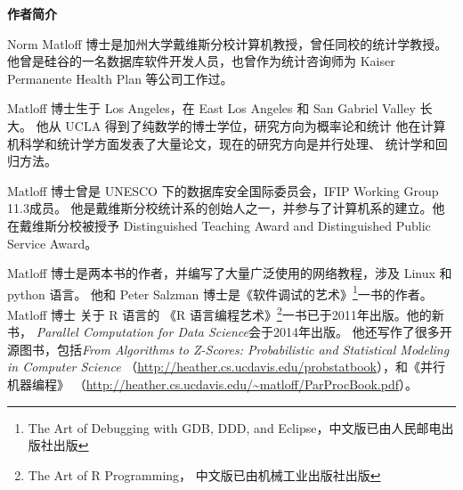 \begin{center}
{\bf 作者简介}
\end{center}

Norm Matloff 博士是加州大学戴维斯分校计算机教授，曾任同校的统计学教授。
他曾是硅谷的一名数据库软件开发人员，也曾作为统计咨询师为 Kaiser Permanente Health Plan 等公司工作过。

Matloff 博士生于 Los Angeles，在 East Los Angeles 和 San Gabriel Valley 长大。
他从 UCLA 得到了纯数学的博士学位，研究方向为概率论和统计
他在计算机科学和统计学方面发表了大量论文，现在的研究方向是并行处理、
统计学和回归方法。


Matloff 博士曾是 UNESCO 下的数据库安全国际委员会，IFIP Working Group 11.3成员。
他是戴维斯分校统计系的创始人之一，并参与了计算机系的建立。他
在戴维斯分校被授予 Distinguished Teaching Award and Distinguished Public Service
Award。

Matloff 博士是两本书的作者，并编写了大量广泛使用的网络教程，涉及 Linux 和 python 语言。
他和 Peter Salzman 博士是《软件调试的艺术》\footnote{The Art of Debugging with GDB, DDD, and
Eclipse，中文版已由人民邮电出版社出版}一书的作者。Matloff 博士
关于 R 语言的 《R 语言编程艺术》\footnote{The Art of R Programming，
中文版已由机械工业出版社出版}一书已于2011年出版。他的新书， {\it Parallel
Computation for Data Science}会于2014年出版。
他还写作了很多开源图书，包括{\it From Algorithms
to Z-Scores: Probabilistic and Statistical Modeling in Computer Science}
（\url{http://heather.cs.ucdavis.edu/probstatbook}），和《并行机器编程》
（\url{http://heather.cs.ucdavis.edu/~matloff/ParProcBook.pdf}）。
